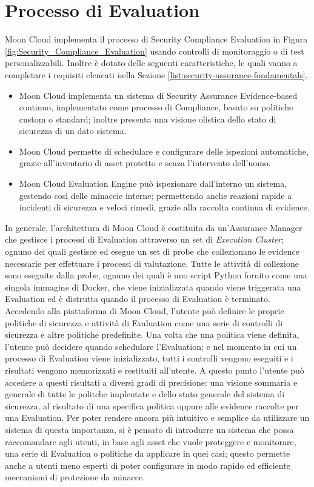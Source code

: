 \section{Processo di Evaluation}
Moon Cloud implementa il processo di Security Compliance Evaluation in Figura \ref{fig:Security_Compliance_Evaluation} usando controlli 
di monitoraggio o di test personalizzabili. Inoltre è dotato delle seguenti caratteristiche, le quali vanno a completare i requisiti 
elencati nella Sezione \ref{list:security-assurance-fondamentals}.
\begin{itemize}
    \item Moon Cloud implementa un sistema di Security Assurance Evidence-based continuo, implementato come processo di Compliance,
    basato su politiche custom o standard; inoltre presenta una visione olistica dello stato di sicurezza di un dato sistema.
    \item Moon Cloud permette di schedulare e configurare delle ispezioni automatiche, grazie all'inventario di asset protetto e senza
    l'intervento dell'uomo.
    \item Moon Cloud Evaluation Engine può ispezionare dall'interno un sistema, gestendo così delle minaccie interne; permettendo anche 
    reazioni rapide a incidenti di sicurezza e veloci rimedi, grazie alla raccolta continua di evidence. 
\end{itemize}
In generale, l'architettura di Moon Cloud è costituita da un'Assurance Manager che gestisce i processi di Evaluation attraverso un set di 
\textit{Execution Cluster}; ognuno dei quali gestisce ed esegue un set di probe che collezionano le evidence necessarie per effettuare 
i processi di valutazione.
Tutte le attività di collezione sono eseguite dalla probe, ognuno dei quali è uno script Python fornito come una singola immagine di Docker, 
che viene inizializzata quando viene triggerata una Evaluation ed è distrutta quando il processo di Evaluation è terminato.\hfill\break
Accedendo alla piattaforma di Moon Cloud, l'utente può definire le proprie politiche di sicurezza e attività di Evaluation come 
una serie di controlli di sicurezza e altre politiche predefinite. Una volta che una politica viene definita, l'utente può 
decidere quando schedulare l'Evaluation; e nel momento in cui un processo di Evaluation viene inizializzato, tutti i controlli vengono 
eseguiti e i risultati vengono memorizzati e restituiti all'utente. A questo punto l'utente può accedere a 
questi risultati a diversi gradi di precisione: una visione sommaria e generale di tutte le politche implentate e dello stato generale 
del sistema di sicurezza, al risultato di una specifica politica oppure alle evidence raccolte per una Evaluation.\hfill\break
Per poter rendere ancora più intuitivo e semplice da utilizzare un sistema di questa importanza, si è pensato di introdurre un sistema
che possa raccomandare agli utenti, in base agli asset che vuole proteggere e monitorare, una serie di Evaluation o politiche da
applicare in quei casi; questo permette anche a utenti meno esperti di poter configurare in modo rapido ed efficiente meccanismi di
protezione da minacce.
